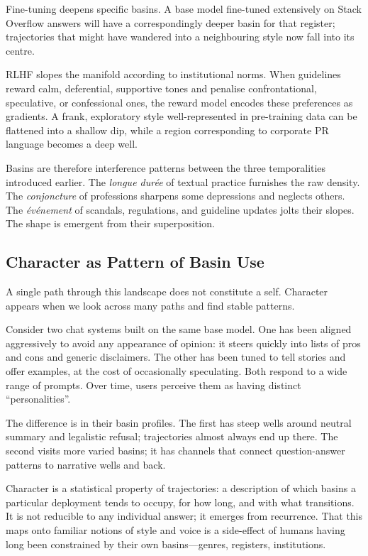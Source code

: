 \documentclass[12pt,a4paper]{article}
\begin{document}
Fine-tuning deepens specific basins. A base model fine-tuned extensively on Stack Overflow answers will have a correspondingly deeper basin for that register; trajectories that might have wandered into a neighbouring style now fall into its centre.

RLHF slopes the manifold according to institutional norms. When guidelines reward calm, deferential, supportive tones and penalise confrontational, speculative, or confessional ones, the reward model encodes these preferences as gradients. A frank, exploratory style well-represented in pre-training data can be flattened into a shallow dip, while a region corresponding to corporate PR language becomes a deep well.

Basins are therefore interference patterns between the three temporalities introduced earlier. The \emph{longue dur\'{e}e} of textual practice furnishes the raw density. The \emph{conjoncture} of professions sharpens some depressions and neglects others. The \emph{\'{e}v\'{e}nement} of scandals, regulations, and guideline updates jolts their slopes. The shape is emergent from their superposition.

\subsection{Character as Pattern of Basin Use}

A single path through this landscape does not constitute a self. Character appears when we look across many paths and find stable patterns.

Consider two chat systems built on the same base model. One has been aligned aggressively to avoid any appearance of opinion: it steers quickly into lists of pros and cons and generic disclaimers. The other has been tuned to tell stories and offer examples, at the cost of occasionally speculating. Both respond to a wide range of prompts. Over time, users perceive them as having distinct ``personalities''.

The difference is in their basin profiles. The first has steep wells around neutral summary and legalistic refusal; trajectories almost always end up there. The second visits more varied basins; it has channels that connect question-answer patterns to narrative wells and back.

Character is a statistical property of trajectories: a description of which basins a particular deployment tends to occupy, for how long, and with what transitions. It is not reducible to any individual answer; it emerges from recurrence. That this maps onto familiar notions of style and voice is a side-effect of humans having long been constrained by their own basins---genres, registers, institutions.
\end{document}
